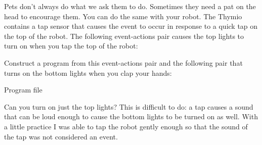 \bigskip




Pets don't always do what we ask them to do. Sometimes they need a pat
on the head to encourage them. You can do the same with your robot. The
Thymio contains a tap sensor that causes the event  to
occur in response to a quick tap on the top of the robot. The following
event-actions pair causes the top lights to turn on when you tap the top
of the robot:


Construct a program from this event-actions pair and the following pair
that turns on the bottom lights when you clap your hands:


{\raggedleft \hfill Program file }

Can you turn on just the top lights? This is difficult to do: a tap
causes a sound that can be loud enough to cause the bottom lights to be
turned on as well. With a little practice I was able to tap the robot
gently enough so that the sound of the tap was not considered an event.

\bigskip

